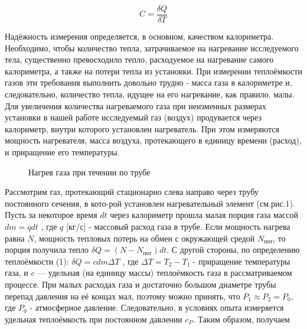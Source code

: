 \documentclass[12pt,a4paper]{article}
\begin{document}
\begin{equation}
C = \dfrac{\delta Q}{\delta T} 
\end{equation}

Надёжность измерения определяется, в основном, качеством калориметра. Необходимо, чтобы количество тепла, затрачиваемое на нагревание исследуемого тела, существенно превосходило тепло, расходуемое на нагревание самого калориметра, а также на потери тепла из установки. При измерении теплоёмкости газов эти требования выполнить довольно трудно - масса газа в калориметре и, следовательно, количество тепла, идущее на его нагревание, как правило, малы. Для увеличения количества нагреваемого газа при неизменных размерах установки в нашей работе исследуемый газ (воздух) продувается через калориметр, внутри которого установлен нагреватель. При этом измеряются мощность нагревателя, масса воздуха, протекающего в единицу времени (расход), и приращение его температуры.



\begin{figure}[h!]
\caption{Нагрев газа при течении по трубе}

\end{figure}
		
		
Рассмотрим газ, протекающий стационарно слева направо через трубу постоянного сечения, в кото-рой установлен нагревательный элемент (см.рис.1). Пусть за некоторое время $dt$ через калориметр прошла малая порция газа массой $dm = q dt$ , где $q$ [кг/с] - массовый расход газа в трубе. Если мощность нагрева равна $N$, мощность тепловых потерь на обмен с окружающей средой $N_{\text{пот}}$, то порция получила тепло $\delta Q =(N - N_{\text{пот}})dt$. С другой стороны, по определению теплоёмкости (1): $\delta Q =c dm \Delta T$ , где $\Delta T = T_2 - T_1$ - приращение температуры газа, и $c$ — удельная (на единицу массы) теплоёмкость газа в рассматриваемом процессе. При малых расходах газа и достаточно большом диаметре трубы перепад давления на её концах мал, поэтому можно принять, что $P_1 \approx P_2 = P_0$, где $P_0$ - атмосферное давление. Следовательно, в условиях опыта измеряется удельная теплоёмкость при постоянном давлении $c_P$. Таким образом, получаем
\end{document}
